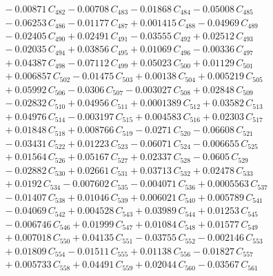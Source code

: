 \documentclass[a4paper,11pt]{article}
\begin{document}
\begin{align}
&\quad - 0.00871\,C_{482} - 0.00708\,C_{483} - 0.01868\,C_{484} - 0.05008\,C_{485} \nonumber\\
&\quad - 0.06253\,C_{486} - 0.01177\,C_{487} + 0.001415\,C_{488} - 0.04969\,C_{489} \nonumber\\
&\quad - 0.02405\,C_{490} + 0.02491\,C_{491} - 0.03555\,C_{492} + 0.02512\,C_{493} \nonumber\\
&\quad - 0.02035\,C_{494} + 0.03856\,C_{495} + 0.01069\,C_{496} - 0.00336\,C_{497} \nonumber\\
&\quad + 0.04387\,C_{498} - 0.07112\,C_{499} + 0.05023\,C_{500} + 0.01129\,C_{501} \nonumber\\
&\quad + 0.006857\,C_{502} - 0.01475\,C_{503} + 0.00138\,C_{504} + 0.005219\,C_{505} \nonumber\\
&\quad + 0.05992\,C_{506} - 0.0306\,C_{507} - 0.003027\,C_{508} + 0.02848\,C_{509} \nonumber\\
&\quad - 0.02832\,C_{510} + 0.04956\,C_{511} + 0.0001389\,C_{512} + 0.03582\,C_{513} \nonumber\\
&\quad + 0.04976\,C_{514} - 0.003197\,C_{515} + 0.004583\,C_{516} + 0.02303\,C_{517} \nonumber\\
&\quad + 0.01848\,C_{518} + 0.008766\,C_{519} - 0.0271\,C_{520} - 0.06608\,C_{521} \nonumber\\
&\quad - 0.03431\,C_{522} + 0.01223\,C_{523} - 0.06071\,C_{524} - 0.006655\,C_{525} \nonumber\\
&\quad + 0.01564\,C_{526} + 0.05167\,C_{527} + 0.02337\,C_{528} - 0.0605\,C_{529} \nonumber\\
&\quad - 0.02882\,C_{530} + 0.02661\,C_{531} + 0.03713\,C_{532} + 0.02478\,C_{533} \nonumber\\
&\quad + 0.0192\,C_{534} - 0.007602\,C_{535} - 0.004071\,C_{536} + 0.0005563\,C_{537} \nonumber\\
&\quad - 0.01407\,C_{538} + 0.01046\,C_{539} + 0.006021\,C_{540} + 0.005789\,C_{541} \nonumber\\
&\quad - 0.04069\,C_{542} + 0.004528\,C_{543} + 0.03989\,C_{544} + 0.01253\,C_{545} \nonumber\\
&\quad - 0.006746\,C_{546} + 0.01999\,C_{547} + 0.01084\,C_{548} + 0.01577\,C_{549} \nonumber\\
&\quad + 0.007018\,C_{550} + 0.04135\,C_{551} - 0.03755\,C_{552} - 0.002146\,C_{553} \nonumber\\
&\quad + 0.01809\,C_{554} - 0.01511\,C_{555} + 0.01138\,C_{556} - 0.01827\,C_{557} \nonumber\\
&\quad + 0.005733\,C_{558} + 0.04491\,C_{559} + 0.02044\,C_{560} - 0.03567\,C_{561} \nonumber\\

\end{align}
\end{document}
